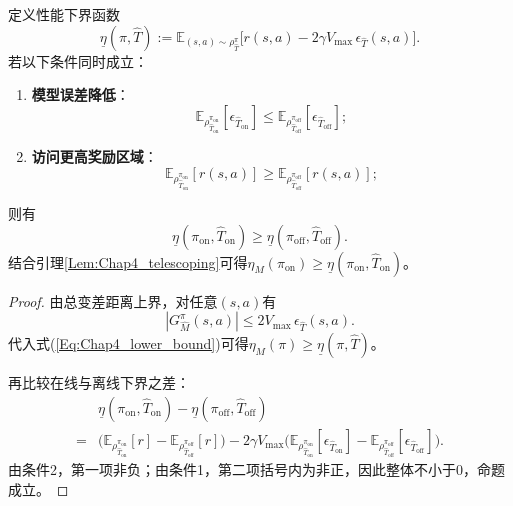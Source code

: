 \begin{thm}\label{Thm:Chap4_policy_improvement}
  定义性能下界函数
  \begin{equation}
    \underline{\eta}(\pi,\hat{T}):=\mathbb{E}_{(s,a)\sim\rho_{\hat{T}}^{\pi}}\big[r(s,a)-2\gamma V_{\max}\,\epsilon_{\hat{T}}(s,a)\big].
  \end{equation}
  若以下条件同时成立：
  \begin{enumerate}
    \item \textbf{模型误差降低}：
    \[
      \mathbb{E}_{\rho_{\hat{T}_{\mathrm{on}}}^{\pi_{\mathrm{on}}}}[\epsilon_{\hat{T}_{\mathrm{on}}}]
      \le
      \mathbb{E}_{\rho_{\hat{T}_{\mathrm{off}}}^{\pi_{\mathrm{off}}}}[\epsilon_{\hat{T}_{\mathrm{off}}}];
    \]
    \item \textbf{访问更高奖励区域}：
    \[
      \mathbb{E}_{\rho_{\hat{T}_{\mathrm{on}}}^{\pi_{\mathrm{on}}}}[r(s,a)]
      \ge
      \mathbb{E}_{\rho_{\hat{T}_{\mathrm{off}}}^{\pi_{\mathrm{off}}}}[r(s,a)];
    \]
  \end{enumerate}
  则有
  \begin{equation}
    \underline{\eta}(\pi_{\mathrm{on}},\hat{T}_{\mathrm{on}})\ge\underline{\eta}(\pi_{\mathrm{off}},\hat{T}_{\mathrm{off}}).
  \end{equation}
  结合引理\ref{Lem:Chap4_telescoping}可得$\eta_M(\pi_{\mathrm{on}})\ge\underline{\eta}(\pi_{\mathrm{on}},\hat{T}_{\mathrm{on}})$。
\end{thm}

\begin{proof}
  由总变差距离上界，对任意$(s,a)$有
  \begin{equation}
    |G_{\hat{M}}^{\pi}(s,a)|\le2V_{\max}\,\epsilon_{\hat{T}}(s,a).
  \end{equation}
  代入式(\ref{Eq:Chap4_lower_bound})可得$\eta_M(\pi)\ge\underline{\eta}(\pi,\hat{T})$。

  再比较在线与离线下界之差：
  \begin{align}
    &\underline{\eta}(\pi_{\mathrm{on}},\hat{T}_{\mathrm{on}})-\underline{\eta}(\pi_{\mathrm{off}},\hat{T}_{\mathrm{off}})\\
    ={}&\Big(\mathbb{E}_{\rho_{\hat{T}_{\mathrm{on}}}^{\pi_{\mathrm{on}}}}[r]-\mathbb{E}_{\rho_{\hat{T}_{\mathrm{off}}}^{\pi_{\mathrm{off}}}}[r]\Big)
    -2\gamma V_{\max}\Big(\mathbb{E}_{\rho_{\hat{T}_{\mathrm{on}}}^{\pi_{\mathrm{on}}}}[\epsilon_{\hat{T}_{\mathrm{on}}}]-\mathbb{E}_{\rho_{\hat{T}_{\mathrm{off}}}^{\pi_{\mathrm{off}}}}[\epsilon_{\hat{T}_{\mathrm{off}}}]\Big).\nonumber
  \end{align}
  由条件2，第一项非负；由条件1，第二项括号内为非正，因此整体不小于0，命题成立。
\end{proof}

